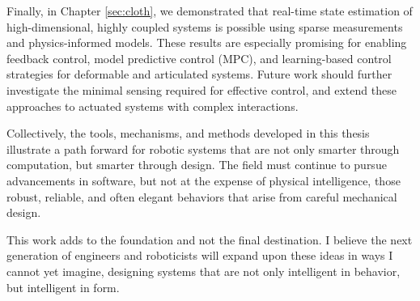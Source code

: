 Finally, in Chapter \ref{sec:cloth}, we demonstrated that real-time state estimation of high-dimensional, highly coupled systems is possible using sparse measurements and physics-informed models. These results are especially promising for enabling feedback control, model predictive control (MPC), and learning-based control strategies for deformable and articulated systems. Future work should further investigate the minimal sensing required for effective control, and extend these approaches to actuated systems with complex interactions.

Collectively, the tools, mechanisms, and methods developed in this thesis illustrate a path forward for robotic systems that are not only smarter through computation, but smarter through design. The field must continue to pursue advancements in software, but not at the expense of physical intelligence, those robust, reliable, and often elegant behaviors that arise from careful mechanical design.

This work adds to the foundation and not the final destination. I believe the next generation of engineers and roboticists will expand upon these ideas in ways I cannot yet imagine, designing systems that are not only intelligent in behavior, but intelligent in form.

